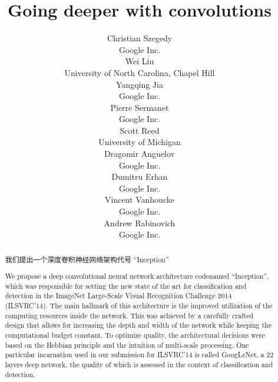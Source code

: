 \documentclass{article}
\title{Going deeper with convolutions}
\author{
Christian Szegedy\\
Google Inc.\\
\And
Wei Liu \\
University of North Carolina, Chapel Hill\\ 
\And
Yangqing Jia\\
Google Inc.\\
\And
Pierre Sermanet \\
Google Inc.\\
\And
Scott Reed\\
University of Michigan\\
\And
Dragomir Anguelov\\
Google Inc.\\
\And
Dumitru Erhan\\
Google Inc.\\
\And
Vincent Vanhoucke\\
Google Inc.\\
\And
Andrew Rabinovich\\
Google Inc.\\
}
\begin{document}
\maketitle

\newtheorem{theorem}{Theorem}[section]
\newtheorem{lemma}[theorem]{Lemma}
\newtheorem{proposition}[theorem]{Proposition}
\newtheorem{corollary}[theorem]{Corollary}


\begin{abstract}
我们提出一个深度卷积神经网络架构代号 “Inception”

We propose a deep convolutional neural network architecture codenamed “Inception”, which was responsible for setting the new state of the art for classification and detection in the ImageNet Large-Scale Visual Recognition Challenge 2014 (ILSVRC’14). The main hallmark of this architecture is the improved utilization of the computing resources inside the network. This was achieved by a carefully crafted design that allows for increasing the depth and width of the network while keeping the computational budget constant. To optimize quality, the architectural decisions were based on the Hebbian principle and the intuition of multi-scale processing. One particular incarnation used in our submission for ILSVRC’14 is called GoogLeNet, a 22 layers deep network, the quality of which is assessed in the context of classification and detection.
\end{abstract}













\end{document}
